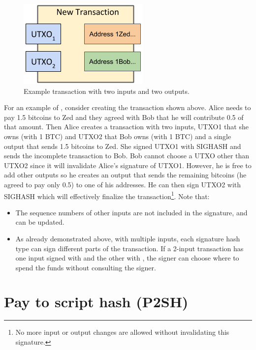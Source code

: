 \begin{figure}[H]
\begin{center}
\includegraphics[scale=0.5]{images/example-transaction}
\caption{Example transaction with two inputs and two outputs.}
\label{fig:example-transaction}
\end{center}
\end{figure}

For an example of , consider creating the transaction shown above. Alice needs to pay 1.5 bitcoins to Zed and they agreed with Bob that he will contribute 0.5 of that amount. Then Alice creates a transaction with two inputs, UTXO1 that she owns (with 1 BTC) and UTXO2 that Bob owns (with 1 BTC) and a single output that sends 1.5 bitcoins to Zed. She signed UTXO1 with SIGHASH  and sends the incomplete transaction to Bob. Bob cannot choose a UTXO other than UTXO2 since it will invalidate Alice’s signature of UTXO1. However, he is free to add other outputs so he creates an output that sends the remaining bitcoins (he agreed to pay only 0.5) to one of his addresses. He can then sign UTXO2 with SIGHASH  which will effectively finalize the transaction\footnote{No more input or output changes are allowed without invalidating this signature.}. Note that:

\begin{itemize}
\item The sequence numbers of other inputs are not included in the signature, and can be updated.
\item As already demonstrated above, with multiple inputs, each signature hash type can sign different parts of the transaction. If a 2-input transaction has one input signed with  and the other with , the  signer can choose where to spend the funds without consulting the  signer.
\end{itemize}


\section{Pay to script hash (P2SH)}
\label{sec:p2sh}

